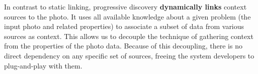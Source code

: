 In contrast to static linking, progressive discovery \textbf{dynamically links} context sources to the photo. It uses all available knowledge about a given problem (the input photo and related properties) to associate a subset of data from various sources as context. This allows us to decouple the technique of gathering context from the properties of the photo data. Because of this decoupling, there is no direct dependency on any specific set of sources, freeing the system developers to plug-and-play with them.




